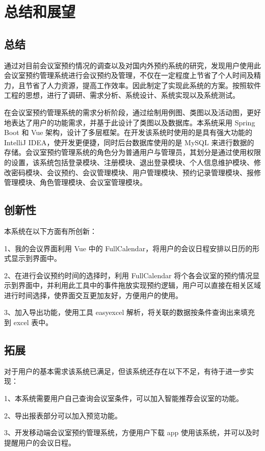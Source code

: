 \documentclass{izdthesis}
\begin{document}
\chapter{总结和展望}

\section{总结}
通过对目前会议室预约情况的调查以及对国内外预约系统的研究，发现用户使用此会议室预约管理系统进行会议预约及管理，不仅在一定程度上节省了个人时间及精力，且节省了人力资源，提高工作效率。因此制定了实现此系统的方案。按照软件工程的思想，进行了调研、需求分析、系统设计、系统实现以及系统测试。

在会议室预约管理系统的需求分析阶段，通过绘制用例图、类图以及活动图，更好地表达了用户的功能需求，并基于此设计了类图以及数据库。本系统采用 Spring Boot 和 Vue 架构，设计了多层框架。在开发该系统时使用的是具有强大功能的 IntelliJ IDEA，使开发更便捷，同时后台数据库使用的是 MySQL 来进行数据的存储。会议室预约管理系统的角色分为普通用户与管理员，其划分是通过使用权限的设置，该系统包括登录模块、注册模块、退出登录模块、个人信息维护模块、修改密码模块、会议预约、会议管理模块、用户管理模块、预约记录管理模块、报修管理模块、角色管理模块、会议室管理模块。

\section{创新性}
本系统在以下方面有所创新：

1、我的会议界面利用 Vue 中的 FullCalendar，将用户的会议日程安排以日历的形式显示到界面中。

2、在进行会议预约时间的选择时，利用 FullCalendar 将个各会议室的预约情况显示到界面中，并利用此工具中的事件拖放实现预约逻辑，用户可以直接在相关区域进行时间选择，使界面交互更加友好，方便用户的使用。

3、加入导出功能，使用工具 easyexcel 解析，将关联的数据按条件查询出来填充到 excel 表中。

\section{拓展}
对于用户的基本需求该系统已满足，但该系统还存在以下不足，有待于进一步实现：

1、本系统需要用户自己查询会议室条件，可以加入智能推荐会议室的功能。

2、导出报表部分可以加入预览功能。

3、开发移动端会议室预约管理系统，方便用户下载 app 使用该系统，并可以及时提醒用户的会议日程。
\end{document}
